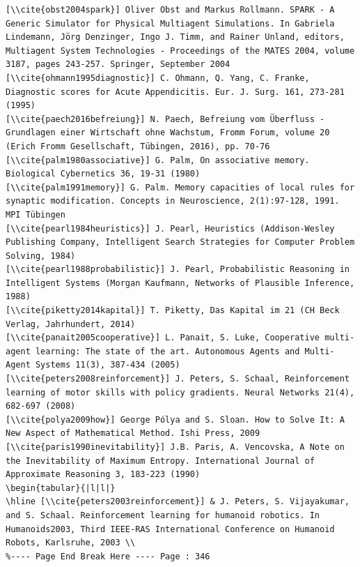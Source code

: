 \documentclass[10pt]{book}
\begin{document}
\begin{verbatim}
[\\cite{obst2004spark}] Oliver Obst and Markus Rollmann. SPARK - A Generic Simulator for Physical Multiagent Simulations. In Gabriela Lindemann, Jörg Denzinger, Ingo J. Timm, and Rainer Unland, editors, Multiagent System Technologies - Proceedings of the MATES 2004, volume 3187, pages 243-257. Springer, September 2004
[\\cite{ohmann1995diagnostic}] C. Ohmann, Q. Yang, C. Franke, Diagnostic scores for Acute Appendicitis. Eur. J. Surg. 161, 273-281 (1995)
[\\cite{paech2016befreiung}] N. Paech, Befreiung vom Überfluss - Grundlagen einer Wirtschaft ohne Wachstum, Fromm Forum, volume 20 (Erich Fromm Gesellschaft, Tübingen, 2016), pp. 70-76
[\\cite{palm1980associative}] G. Palm, On associative memory. Biological Cybernetics 36, 19-31 (1980)
[\\cite{palm1991memory}] G. Palm. Memory capacities of local rules for synaptic modification. Concepts in Neuroscience, 2(1):97-128, 1991. MPI Tübingen
[\\cite{pearl1984heuristics}] J. Pearl, Heuristics (Addison-Wesley Publishing Company, Intelligent Search Strategies for Computer Problem Solving, 1984)
[\\cite{pearl1988probabilistic}] J. Pearl, Probabilistic Reasoning in Intelligent Systems (Morgan Kaufmann, Networks of Plausible Inference, 1988)
[\\cite{piketty2014kapital}] T. Piketty, Das Kapital im 21 (CH Beck Verlag, Jahrhundert, 2014)
[\\cite{panait2005cooperative}] L. Panait, S. Luke, Cooperative multi-agent learning: The state of the art. Autonomous Agents and Multi-Agent Systems 11(3), 387-434 (2005)
[\\cite{peters2008reinforcement}] J. Peters, S. Schaal, Reinforcement learning of motor skills with policy gradients. Neural Networks 21(4), 682-697 (2008)
[\\cite{polya2009how}] George Pólya and S. Sloan. How to Solve It: A New Aspect of Mathematical Method. Ishi Press, 2009
[\\cite{paris1990inevitability}] J.B. Paris, A. Vencovska, A Note on the Inevitability of Maximum Entropy. International Journal of Approximate Reasoning 3, 183-223 (1990)
\begin{tabular}{|l|l|}
\hline [\\cite{peters2003reinforcement}] & J. Peters, S. Vijayakumar, and S. Schaal. Reinforcement learning for humanoid robotics. In Humanoids2003, Third IEEE-RAS International Conference on Humanoid Robots, Karlsruhe, 2003 \\
%---- Page End Break Here ---- Page : 346


\end{verbatim}
\end{document}
